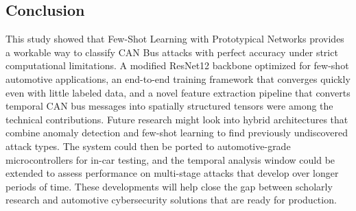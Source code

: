 \subsection{Conclusion}
This study showed that Few-Shot Learning with Prototypical Networks provides a workable way to classify CAN Bus attacks with perfect accuracy under strict computational limitations. A modified ResNet12 backbone optimized for few-shot automotive applications, an end-to-end training framework that converges quickly even with little labeled data, and a novel feature extraction pipeline that converts temporal CAN bus messages into spatially structured tensors were among the technical contributions. Future research might look into hybrid architectures that combine anomaly detection and few-shot learning to find previously undiscovered attack types. The system could then be ported to automotive-grade microcontrollers for in-car testing, and the temporal analysis window could be extended to assess performance on multi-stage attacks that develop over longer periods of time. These developments will help close the gap between scholarly research and automotive cybersecurity solutions that are ready for production.